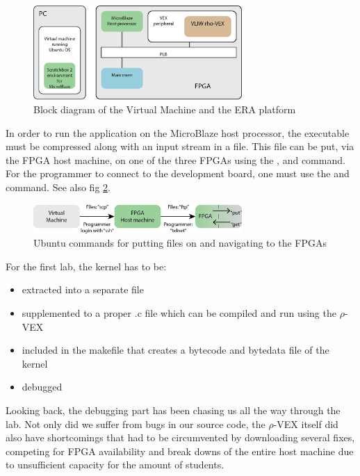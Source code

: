 \begin{figure}[htb]%
\centering
\includegraphics[width=300px]{Pictures/platform}%
\caption{Block diagram of the Virtual Machine and the ERA platform}%
\label{fig:lelijk}%
\end{figure}

In order to run the application on the MicroBlaze host processor, the  executable must be compressed along with an input stream in a  file. This file can be put, via the FPGA host machine, on one of the three FPGAs using the ,  and  command. For the programmer to connect to the development board, one must use the  and  command. See also fig \ref{fig:hoppen}.


\begin{figure}[htb]%
\centering
\includegraphics[width=300px]{Pictures/hoprecht}%
\caption{Ubuntu commands for putting files on and navigating to the FPGAs}%
\label{fig:hoppen}%
\end{figure}

For the first lab, the  kernel has to be:
\begin{itemize}
	\item extracted into a separate file
	\item supplemented to a proper .c file which can be compiled and run using the $\rho$-VEX
	\item included in the makefile that creates a bytecode and bytedata file of the kernel
	\item debugged
\end{itemize}

Looking back, the debugging part has been chasing us all the way through the lab. Not only did we suffer from bugs in our source code, the $\rho$-VEX itself did also have shortcomings that had to be circumvented by downloading several fixes, competing for FPGA availability and break downs of the entire host machine due to unsufficient capacity for the amount of students.

